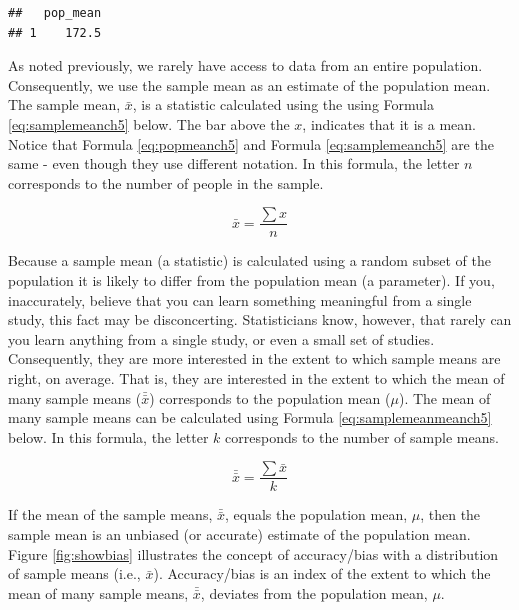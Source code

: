 \documentclass[
]{krantz}
\makeatletter
\newenvironment{Shaded}{\begin{snugshade}}{\end{snugshade}}
\newcommand{\DataTypeTok}[1]{\textcolor[rgb]{0.27,0.27,0.27}{#1}}
\newcommand{\KeywordTok}[1]{\textcolor[rgb]{0.27,0.27,0.27}{\textbf{#1}}}
\newcommand{\NormalTok}[1]{#1}
\newcommand{\OperatorTok}[1]{\textcolor[rgb]{0.43,0.43,0.43}{\textbf{#1}}}
\newcommand{\StringTok}[1]{\textcolor[rgb]{0.5,0.5,0.5}{#1}}
\newenvironment{kframe}{%
\medskip{}
\setlength{\fboxsep}{.8em}
 \def\at@end@of@kframe{}%
 \ifinner\ifhmode%
  \def\at@end@of@kframe{\end{minipage}}%
  \begin{minipage}{\columnwidth}%
 \fi\fi%
 \def\FrameCommand##1{\hskip\@totalleftmargin \hskip-\fboxsep
 \colorbox{shadecolor}{##1}\hskip-\fboxsep
     \hskip-\linewidth \hskip-\@totalleftmargin \hskip\columnwidth}%
 \MakeFramed {\advance\hsize-\width
   \@totalleftmargin\z@ \linewidth\hsize
   \@setminipage}}%
 {\par\unskip\endMakeFramed%
 \at@end@of@kframe}
\renewenvironment{Shaded}{\begin{kframe}}{\end{kframe}}
\makeatother
\begin{document}
\begin{Shaded}
\end{Shaded}

\begin{verbatim}
##   pop_mean
## 1    172.5
\end{verbatim}

As noted previously, we rarely have access to data from an entire population. Consequently, we use the sample mean as an estimate of the population mean. The sample mean, \(\bar{x}\), is a statistic calculated using the using Formula \eqref{eq:samplemeanch5} below. The bar above the \(x\), indicates that it is a mean. Notice that Formula \eqref{eq:popmeanch5} and Formula \eqref{eq:samplemeanch5} are the same - even though they use different notation. In this formula, the letter \(n\) corresponds to the number of people in the sample.

\begin{equation} 
\bar{x} = \frac{\sum{x}}{n}
      \label{eq:samplemeanch5}
\end{equation}

Because a sample mean (a statistic) is calculated using a random subset of the population it is likely to differ from the population mean (a parameter). If you, inaccurately, believe that you can learn something meaningful from a single study, this fact may be disconcerting. Statisticians know, however, that rarely can you learn anything from a single study, or even a small set of studies. Consequently, they are more interested in the extent to which sample means are right, on average. That is, they are interested in the extent to which the mean of many sample means (\(\bar{\bar{x}}\)) corresponds to the population mean (\(\mu\)). The mean of many sample means can be calculated using Formula \eqref{eq:samplemeanmeanch5} below. In this formula, the letter \(k\) corresponds to the number of sample means.

\begin{equation} 
\bar{\bar{x}} = \frac{\sum{\bar{x}}}{k}
      \label{eq:samplemeanmeanch5}
\end{equation}

If the mean of the sample means, \(\bar{\bar{x}}\), equals the population mean, \(\mu\), then the sample mean is an unbiased (or accurate) estimate of the population mean. Figure \ref{fig:showbias} illustrates the concept of accuracy/bias with a distribution of sample means (i.e., \(\bar{x}\)). Accuracy/bias is an index of the extent to which the mean of many sample means, \(\bar{\bar{x}}\), deviates from the population mean, \(\mu\).
\end{document}

